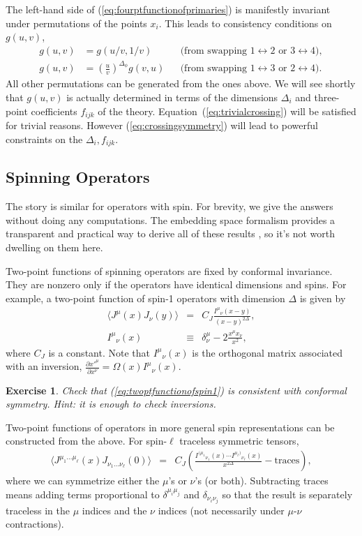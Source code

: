 \documentclass{ws-rv9x6}
\newcommand\be{\begin{eqnarray}}
\newcommand\ee{\end{eqnarray}}
\newcommand\f\phi
\newcommand\p[1]{\left(#1\right)}
\newcommand\<\langle
\renewcommand\>\rangle
\newcommand\de\delta
\renewcommand\.{\cdot}
\newcommand\pdr[2]{\frac{\partial #1}{\partial #2}}
\newcommand\De{\Delta}
\newtheorem{exercise}{Exercise}[section]
\begin{document}
The left-hand side of (\ref{eq:fourptfunctionofprimaries}) is manifestly invariant under permutations of the points $x_i$.  This leads to consistency conditions on $g(u,v)$,
\begin{align}
\label{eq:trivialcrossing}
g(u,v) &= g(u/v,1/v) && \textrm{(from swapping $1\leftrightarrow 2$ or $3\leftrightarrow 4$)},\\
\label{eq:crossingsymmetry}
g(u,v) &= \p{\frac{u}{v}}^{\De_\f} g(v,u) && \textrm{(from swapping $1\leftrightarrow 3$ or $2\leftrightarrow 4$)}.
\end{align}
All other permutations can be generated from the ones above.  We will see shortly that $g(u,v)$ is  actually determined in terms of the dimensions $\De_i$ and three-point coefficients $f_{ijk}$ of the theory.  Equation~(\ref{eq:trivialcrossing}) will be satisfied for trivial reasons.  However (\ref{eq:crossingsymmetry}) will lead to powerful constraints on the $\De_i, f_{ijk}$.

\subsection{Spinning Operators}

The story is similar for operators with spin.  For brevity, we give the answers without doing any computations.  The embedding space formalism provides a transparent and practical way to derive all of these results \cite{Costa:2011mg}, so it's not worth dwelling on them here.

Two-point functions of spinning operators are fixed by conformal invariance.  They are nonzero only if the operators have identical dimensions and spins.  For example, a two-point function of spin-1 operators with dimension $\Delta$ is given by
\be
\label{eq:twoptfunctionofspin1}
\<J^\mu(x)J_\nu(y)\> &=& C_J \frac{I^\mu{}_{\nu}(x-y)}{(x-y)^{2\De}},\\
 I^{\mu}{}_{\nu}(x)&\equiv& \de^\mu_\nu-2\frac{x^\mu x_\nu}{x^2},
 \label{eq:Itensor}
\ee
where $C_J$ is a constant. Note that $I^\mu{}_{\nu}(x)$ is the orthogonal matrix associated with an inversion, $\pdr{x'^\mu}{x^\nu}=\Omega(x) I^\mu{}_\nu(x)$.
\begin{exercise}
Check that (\ref{eq:twoptfunctionofspin1}) is consistent with conformal symmetry.  Hint: it is enough to check inversions.
\end{exercise}

Two-point functions of operators in more general spin representations can be constructed from the above.  For spin-$\ell$ traceless symmetric tensors,
\be
\label{eq:twopointfunctionofspinL}
\<J^{\mu_1\dots\mu_\ell}(x)J_{\nu_1\dots\nu_\ell}(0)\> &=& C_J \p{\frac{I^{(\mu_1}{}_{\nu_1}(x)\cdots I^{\mu_\ell)}{}_{\nu_\ell}(x)}{x^{2\De}} - \mathrm{traces}},
\ee
where we can symmetrize either the $\mu$'s or $\nu$'s (or both).  Subtracting traces means adding terms proportional to $\de^{\mu_i\mu_j}$ and $\de_{\nu_i\nu_j}$ so that the result is separately traceless in the $\mu$ indices and the $\nu$ indices (not necessarily under $\mu$-$\nu$ contractions).
\end{document}
